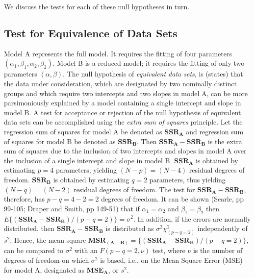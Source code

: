\documentclass[11pt, oneside]{article}   	%
\begin{document}
\vspace{2 mm}

We discuss the tests for each of these null hypotheses in turn.     


\subsection{Test for Equivalence of Data Sets} 
Model A represents the full model. It requires the fitting of four parameters $  (\alpha_{1}, \beta_{1}, \alpha_{2}, \beta_{2}) $. Model B is a reduced model; it requires the fitting of only two parameters $  (\alpha,  \beta) $. The null hypothesis  of \emph{equivalent data sets}, is (states) that the data under consideration, which are designated by two nominally distinct groups and which require two intercepts and two slopes in model A, can be more parsimoniously explained by a model containing a single intercept and slope in model B. A test for acceptance or rejection of the null hypothesis of equivalent data sets can be accomplished using the \emph{extra sum of squares} principle. Let the regression sum of squares for model A be denoted as $ \mathbf{SSR_{A}} $ and regression sum of squares for model B be denoted as $ \mathbf{SSR_{B}} $.  Then $ \mathbf{SSR_{A}} -  \mathbf{SSR_{B}} $ is the extra sum of squares due to the inclusion of two intercepts and slopes in model A over the inclusion of a single intercept and slope in model B. $ \mathbf{SSR_{A}} $ is obtained by estimating $ p = 4 $ parameters, yielding $ (N - p)  = (N - 4) $ residual degrees of freedom.  $  \mathbf{SSR_{B}} $ is obtained by estimating $ q = 2 $ parameters, thus yielding $  (N - q) = (N - 2)  $ residual degrees of freedom.  The test for $ \mathbf{SSR_{A}} -  \mathbf{SSR_{B}} $, therefore,  has $  p - q = 4 - 2 = 2  $ degrees of freedom.  It can be shown (Searle, pp 99-105; Draper and Smith, pp 149-51) that if $ \alpha_{1} = \alpha_{2} $    and  $  \beta_{1} = \beta_{2}   $ then $ E\{  (\mathbf{SSR_{A}} -  \mathbf{SSR_{B}})   / (p - q = 2) \} = \sigma^{2} $.  In addition, if the errors are normally distributed, then $ \mathbf{SSR_{A}} -  \mathbf{SSR_{B}} $ is distributed as  $ \sigma^{2} \chi^{2}_{(p-q=2)}  $ independently of $ s^{2}  $.  Hence, the mean square $ \mathbf{MSR_{(A-B)}}  =  \{  (\mathbf{SSR_{A}} -  \mathbf{SSR_{B}})   / (p - q = 2) \} $, can be compared to $ \sigma^{2} $ with an $ F (p-q =2, \nu) $ test, where $ \nu $ is the number of degrees of freedom on which $ \sigma^{2} $ is based, i.e., on the Mean Square Error (MSE) for model A, designated as $ \mathbf{MSE_{A}} $, or $  s^2 $.  
\end{document}

